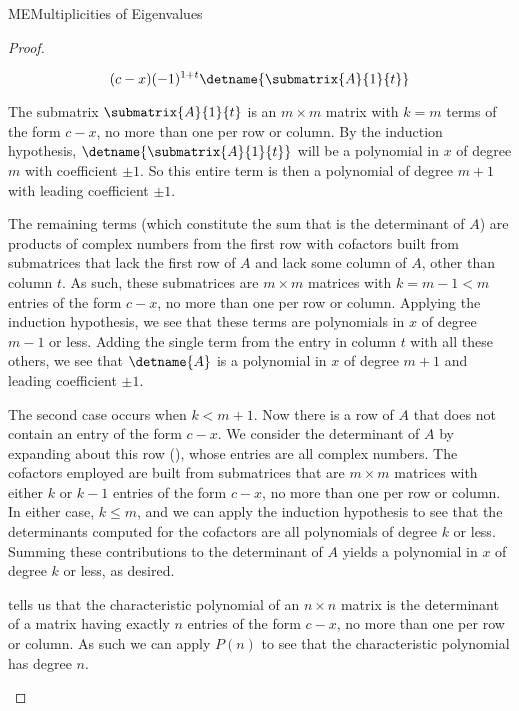 \begin{subsect}{ME}{Multiplicities of Eigenvalues}
\begin{proof}
\begin{para}
%
\begin{equation*}
(c-x)(-1)^{1+t}\detname{\submatrix{A}{1}{t}}
\end{equation*}
\end{para}
%
\begin{para}The submatrix $\submatrix{A}{1}{t}$ is an $m\times m$ matrix with $k=m$ terms of the form $c-x$, no more than one per row or column.  By the induction hypothesis, $\detname{\submatrix{A}{1}{t}}$ will be a polynomial in $x$ of degree $m$ with coefficient $\pm 1$.  So this entire term is then a polynomial of degree $m+1$ with leading coefficient $\pm 1$.\end{para}
%
\begin{para}The remaining terms (which constitute the sum that is the determinant of $A$) are products of complex numbers from the first row with cofactors built from submatrices that lack the first row of $A$ and lack some column of $A$, other than column $t$.  As such, these submatrices are
$m\times m$ matrices with $k=m-1<m$ entries
of the form $c-x$, no more than one per row or column.  Applying the induction hypothesis, we see that these terms are polynomials in $x$ of degree $m-1$ or less.  Adding the single term from the entry in column $t$ with all these others, we see that $\detname{A}$ is a polynomial in $x$ of degree $m+1$ and leading coefficient $\pm 1$.\end{para}
%
\begin{para}
The second case occurs when $k<m+1$.
Now there is a row of $A$ that does not contain an entry of the form $c-x$.  We consider the determinant of $A$ by expanding about this row (), whose entries are all complex numbers.  The cofactors employed are built from submatrices that are $m\times m$ matrices with either $k$ or $k-1$ entries of the form $c-x$, no more than one per row or column.  In either case, $k\leq m$, and we can apply the induction hypothesis to see that the determinants computed for the cofactors are all polynomials of degree $k$ or less.  Summing these contributions to the determinant of $A$ yields a polynomial in $x$ of degree $k$ or less, as desired.\end{para}
%
\begin{para} tells us that the characteristic polynomial of an $n\times n$ matrix is the determinant of a matrix having exactly $n$ entries of the form $c-x$, no more than one per row or column.  As such we can apply $P(n)$ to see that the characteristic polynomial has degree $n$.\end{para}

\end{proof}
\end{subsect}
